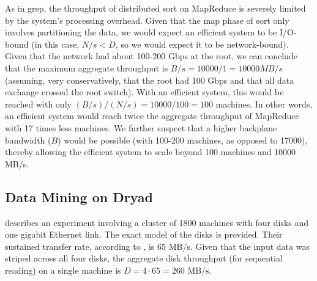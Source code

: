 \documentclass{acm_proc_article-sp}
\begin{document}
As in grep, the throughput of distributed sort on MapReduce is severely limited by the system's processing overhead. Given that the map phase of sort only involves partitioning the data, we would expect an efficient system to be I/O-bound (in this case, $N/s < D$, so we would expect it to be network-bound). Given that the network had about 100-200 Gbps at the root, we can conclude that the maximum aggregate throughput is $B/s = 10000/1 = 10000 MB/s$ (assuming, very conservatively, that the root had 100 Gbps and that all data exchange crossed the root switch). With an efficient system, this would be reached with only $(B/s) / (N/s) = 10000/100 = 100$ machines. In other words, an efficient system would reach twice the aggregate throughput of MapReduce with 17 times less machines. We further suspect that a higher backplane bandwidth ($B$) would be possible (with 100-200 machines, as opposed to 17000), thereby allowing the efficient system to scale beyond 100 machines and 10000 MB/s.

\subsection{Data Mining on Dryad}
\cite{dryad} describes an experiment involving a cluster of 1800 machines with four disks and one gigabit Ethernet link. The exact model of the disks is provided. Their sustained transfer rate, according to \cite{wd400gb}, is 65 MB/s. Given that the input data was striped across all four disks, the aggregate disk throughput (for sequential reading) on a single machine is $D = 4 \cdot 65 = 260 \text{ MB/s}$.
\end{document}
